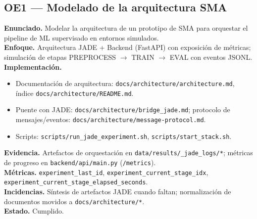 \subsection*{OE1 — Modelado de la arquitectura SMA}
\textbf{Enunciado.} Modelar la arquitectura de un prototipo de SMA para orquestar el pipeline de ML supervisado en entornos simulados.\\
\textbf{Enfoque.} Arquitectura JADE + Backend (FastAPI) con exposición de métricas; simulación de etapas PREPROCESS $\rightarrow$ TRAIN $\rightarrow$ EVAL con eventos JSONL.\\
\textbf{Implementación.}
\begin{itemize}
  \item Documentación de arquitectura: \texttt{docs/architecture/architecture.md}, índice \texttt{docs/architecture/README.md}.
  \item Puente con JADE: \texttt{docs/architecture/bridge\_jade.md}; protocolo de mensajes/eventos: \texttt{docs/architecture/message-protocol.md}.
  \item Scripts: \texttt{scripts/run\_jade\_experiment.sh}, \texttt{scripts/start\_stack.sh}.
\end{itemize}
\textbf{Evidencia.} Artefactos de orquestación en \texttt{data/results/\_jade\_logs/*}; métricas de progreso en \texttt{backend/api/main.py} (\texttt{/metrics}).\\
\textbf{Métricas.} \texttt{experiment\_last\_id}, \texttt{experiment\_current\_stage\_idx}, \texttt{experiment\_current\_stage\_elapsed\_seconds}.\\
\textbf{Incidencias.} Síntesis de artefactos JADE cuando faltan; normalización de documentos movidos a \texttt{docs/architecture/*}.\\
\textbf{Estado.} Cumplido.

